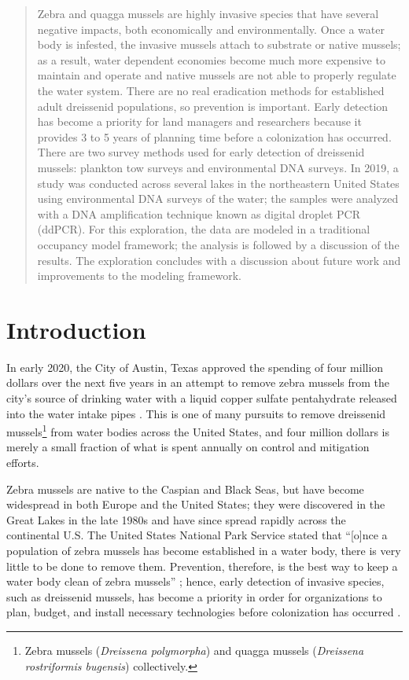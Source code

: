 \documentclass[12pt]{article}\usepackage[]{graphicx}\usepackage[]{color}
\begin{document}
\begin{abstract}
\noindent Zebra and quagga mussels are highly invasive species that have several negative impacts, both economically and environmentally. Once a water body is infested, the invasive mussels attach to substrate or native mussels; as a result, water dependent economies become much more expensive to maintain and operate and native mussels are not able to properly regulate the water system. There are no real eradication methods for established adult dreissenid populations, so prevention is important. Early detection has become a priority for land managers and researchers because it provides 3 to 5 years of planning time before a colonization has occurred. There are two survey methods used for early detection of dreissenid mussels: plankton tow surveys and environmental DNA surveys. In 2019, a study was conducted across several lakes in the northeastern United States using environmental DNA surveys of the water; the samples were analyzed with a DNA amplification technique known as digital droplet PCR (ddPCR). For this exploration, the data are modeled in a traditional occupancy model framework; the analysis is followed by a discussion of the results. The exploration concludes with a discussion about future work and improvements to the modeling framework. 
\end{abstract}

\newpage

\doublespacing

\section{Introduction}

In early 2020, the City of Austin, Texas approved the spending of four million dollars over the next five years in an attempt to remove zebra mussels from the city's source of drinking water with a liquid copper sulfate pentahydrate released into the water intake pipes \cite{CBS:Austin}. This is one of many pursuits to remove dreissenid mussels\footnote{Zebra mussels (\textit{Dreissena polymorpha}) and quagga mussels (\textit{Dreissena rostriformis bugensis}) collectively.} from water bodies across the United States, and four million dollars is merely a small fraction of what is spent annually on control and mitigation efforts.

Zebra mussels are native to the Caspian and Black Seas, but have become widespread in both Europe and the United States; they were discovered in the Great Lakes in the late 1980s and have since spread rapidly across the continental U.S. The United States National Park Service stated that ``[o]nce a population of zebra mussels has become established in a water body, there is very little to be done to remove them. Prevention, therefore, is the best way to keep a water body clean of zebra mussels'' \cite{NPS}; hence, early detection of invasive species, such as dreissenid mussels, has become a priority in order for organizations to plan, budget, and install necessary technologies before colonization has occurred \cite{Holser:body}. 
\end{document}
